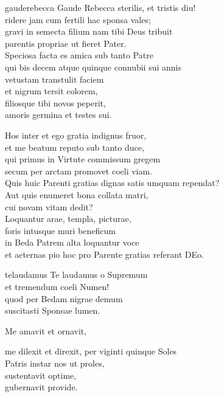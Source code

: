 \documentclass[tocstyle=ref-genre]{ees}
\begin{document}
{\begin{movement}{gauderebecca}
  Gaude Rebecca sterilis, et tristis diu!\\
  ridere jam cum fertili hac sponsa vales;\\
  gravi in semecta filium nam tibi Deus tribuit\\
  parentis propriae ut fieret Pater.\\
  Speciosa facta es amica sub tanto Patre\\
  qui bis decem atque quinque connubii sui annis\\
  vetustam transtulit faciem\\
  et nigrum tersit colorem,\\
  filiosque tibi novos peperit,\\
  amoris germina et testes sui.

  \voice[Levita]
  Hos inter et ego gratia indignus fruor,\\
  et me beatum reputo sub tanto duce,\\
  qui primus in Virtute commissum gregem\\
  secum per arctam promovet coeli viam.\\
  Quis huic Parenti gratias dignas satis umquam rependat?\\
  Aut quis enumeret bona collata matri,\\
  cui novam vitam dedit?\\
  Loquantur arae, templa, picturae,\\
  foris intusque muri beneficum\\
  in Beda Patrem alta loquantur voce\\
  et aeternas pio hoc pro Parente gratias referant DEo.
\end{movement}

\begin{movement}{telaudamus}
  \voice[Coro]
  Te laudamus o Supremum\\
  et tremendum coeli Numen!\\
  quod per Bedam nigrae demum\\
  suscitasti Sponsae lumen.

  Me amavit et ornavit,

  \voice[Levita]
  me dilexit et direxit,
  \newpage
  per viginti quinque Soles\\
  Patris instar nos ut proles,\\
  sustentavit optime,\\
  gubernavit provide.


\end{movement}}
\end{document}
